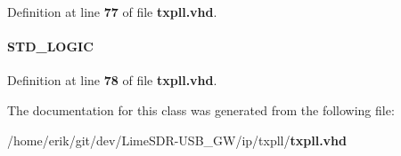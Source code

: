 Definition at line {\bf 77} of file {\bf txpll.\+vhd}.

\paragraph[{sub\+\_\+wire9}]{ {\bfseries \textcolor{comment}{S\+T\+D\+\_\+\+L\+O\+G\+IC}\textcolor{vhdlchar}{ }} \hspace{0.3cm}{\ttfamily [Signal]}}\label{classtxpll_1_1SYN_afb9987791dcdc8a6fcf5b1bcae35a592}


Definition at line {\bf 78} of file {\bf txpll.\+vhd}.



The documentation for this class was generated from the following file\+:\begin{DoxyCompactItemize}
\item 
/home/erik/git/dev/\+Lime\+S\+D\+R-\/\+U\+S\+B\+\_\+\+G\+W/ip/txpll/{\bf txpll.\+vhd}\end{DoxyCompactItemize}
